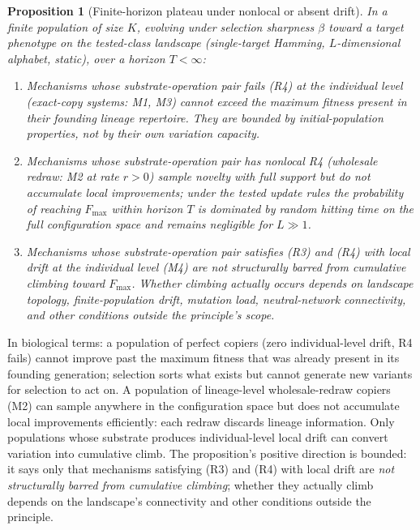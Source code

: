 \documentclass[aps,prx,reprint,amsmath,amssymb,floatfix,superscriptaddress,nofootinbib]{revtex4-2}
\theoremstyle{plain-thm}
\newtheorem{proposition}[theorem]{Proposition}
\theoremstyle{definition-thm}
\begin{document}
\begin{proposition}[Finite-horizon plateau under nonlocal or absent drift]
\label{prop:plateau}
In a finite population of size $K$, evolving under selection sharpness $\beta$ toward a target phenotype on the tested-class landscape (single-target Hamming, $L$-dimensional alphabet, static), over a horizon $T < \infty$:
\begin{enumerate}
\item Mechanisms whose substrate-operation pair fails (R4) at the individual level (exact-copy systems: M1, M3) cannot exceed the maximum fitness present in their founding lineage repertoire. They are bounded by initial-population properties, not by their own variation capacity.
\item Mechanisms whose substrate-operation pair has nonlocal R4 (wholesale redraw: M2 at rate $r > 0$) sample novelty with full support but do not accumulate local improvements; under the tested update rules the probability of reaching $F_{\max}$ within horizon $T$ is dominated by random hitting time on the full configuration space and remains negligible for $L \gg 1$.
\item Mechanisms whose substrate-operation pair satisfies (R3) and (R4) with local drift at the individual level (M4) are not structurally barred from cumulative climbing toward $F_{\max}$. Whether climbing actually occurs depends on landscape topology, finite-population drift, mutation load, neutral-network connectivity, and other conditions outside the principle's scope.
\end{enumerate}
\end{proposition}

In biological terms: a population of perfect copiers (zero individual-level drift, R4 fails) cannot improve past the maximum fitness that was already present in its founding generation; selection sorts what exists but cannot generate new variants for selection to act on. A population of lineage-level wholesale-redraw copiers (M2) can sample anywhere in the configuration space but does not accumulate local improvements efficiently: each redraw discards lineage information. Only populations whose substrate produces individual-level local drift can convert variation into cumulative climb. The proposition's positive direction is bounded: it says only that mechanisms satisfying (R3) and (R4) with local drift are \emph{not structurally barred from cumulative climbing}; whether they actually climb depends on the landscape's connectivity and other conditions outside the principle.
\end{document}
